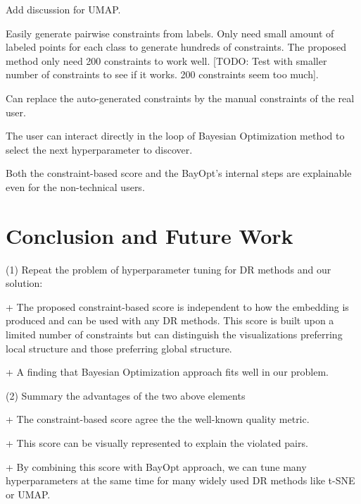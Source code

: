 \par
Add discussion for UMAP.

\par
Easily generate pairwise constraints from labels.
  Only need small amount of labeled points for each class to generate hundreds of constraints.
  The proposed method only need 200 constraints to work well.
  [TODO: Test with smaller number of constraints to see if it works. 200 constraints seem too much].

\par
Can replace the auto-generated constraints by the manual constraints of the real user.

\par
The user can interact directly in the loop of Bayesian Optimization method to select the next hyperparameter to discover.


\par
Both the constraint-based score and the BayOpt's internal steps are explainable even for the non-technical users. 



\section{Conclusion and Future Work}

\par (1) Repeat the problem of hyperparameter tuning for DR methods and our solution:

+ The proposed constraint-based score is independent to how the embedding is produced and can be used with any DR methods.
This score is built upon a limited number of constraints but can distinguish the visualizations preferring local structure and those preferring global structure.

+ A finding that Bayesian Optimization approach fits well in our problem.


\vspace{8pt}
\par (2) Summary the advantages of the two above elements

+ The constraint-based score agree the the well-known quality metric.

+ This score can be visually represented to explain the violated pairs.

+ By combining this score with BayOpt approach, we can tune many hyperparameters at the same time for many widely used DR methods like t-SNE or UMAP.

